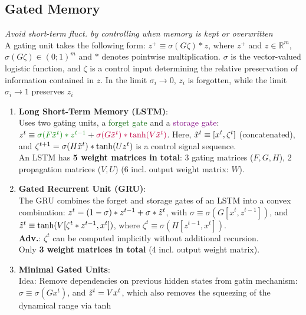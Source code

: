 \subsection{Gated Memory}
\emph{\textrightarrow Avoid short-term fluct. by controlling when memory is kept or overwritten} \\
A gating unit takes the following form: $z^+ \equiv \sigma(G\zeta) * z$, where $z^+$ and $z \in \mathbb{R}^m$, $\sigma(G\zeta) \in (0;1)^m$ and $*$ denotes pointwise multiplication. $\sigma$ is the vector-valued logistic function, and $\zeta$ is a control input determining the relative preservation of information contained in $z$. In the limit $\sigma_i \rightarrow 0$, $z_i$ is forgotten, while the limit $\sigma_i \rightarrow 1$ preserves $z_i$
\begin{enumerate}
    \item \textbf{Long Short-Term Memory (LSTM)}: \\
    Uses two gating units, a \textcolor{darkgreen}{forget gate} and a \textcolor{purple}{storage gate}: \\
    $z^t \equiv \textcolor{darkgreen}{\sigma(F\Tilde{x}^t) * z^{t-1}} + \textcolor{purple}{\sigma(G\Tilde{x}^t) * \text{tanh}(V\Tilde{x}^t)}$. Here, $\Tilde{x}^t \equiv [x^t, \zeta^t]$ (concatenated), and $\zeta^{t+1} = \sigma(H\Tilde{x}^t) * \text{tanh}(Uz^t)$ is a control signal sequence. \\
    \textrightarrow An LSTM has \textbf{5 weight matrices in total}: 3 gating matrices ($F, G, H$), 2 propagation matrices ($V, U$) (6 incl. output weight matrix: $W$).
    
    \item \textbf{Gated Recurrent Unit (GRU)}: \\
    The GRU combines the forget and storage gates of an LSTM into a convex combination: $z^t = (1-\sigma) * z^{t-1} + \sigma * \Tilde{z}^t$, with $\sigma \equiv \sigma(G[x^t, z^{t-1}])$, and $\Tilde{z}^t \equiv \text{tanh}(V[\zeta^t * z^{t-1}, x^t])$, where $\zeta^t \equiv \sigma(H[z^{t-1}, x^t])$. \\
    \textbf{Adv.}: $\zeta^t$ can be computed implicitly without additional recursion.\\
    \textrightarrow Only \textbf{3 weight matrices in total} (4 incl. output weight matrix).

    \item \textbf{Minimal Gated Units}: \\
    Idea: Remove dependencies on previous hidden states from gatin mechanism: $\sigma \equiv \sigma(Gx^t)$, and $\Tilde{z}^t = Vx^t$, which also removes the squeezing of the dynamical range via tanh
    
\end{enumerate}


